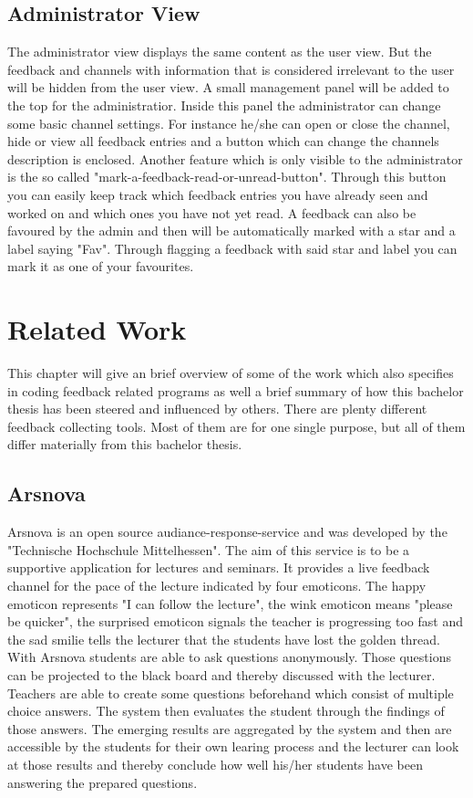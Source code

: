 \section{Administrator View}
The administrator view displays the same content as the user view. But the feedback and channels with information that is considered irrelevant to the user will be hidden from the user view. A small management panel will be added to the top for the administratior. Inside this panel the administrator can change some basic channel settings. For instance he/she can open or close the channel, hide or view all feedback entries and a button which can change the channels description is enclosed.
Another feature which is only visible to the administrator is the so called "mark-a-feedback-read-or-unread-button". Through this button you can easily keep track which feedback entries  you have already seen and worked on and which ones you have not yet read. A feedback can also be favoured by the admin and then will be automatically marked with a star and a label saying "Fav". Through flagging a feedback with said star and label you can mark it as one of your favourites.


\chapter{Related Work}
This chapter will give an brief overview of some of the work which also specifies in coding feedback related programs as well a brief summary of how this bachelor thesis has been steered and influenced by others. There are plenty different feedback collecting tools. Most of them are for one single purpose, but all of them differ materially from this bachelor thesis.

\section{Arsnova}
Arsnova is an open source audiance-response-service and was developed by the "Technische Hochschule Mittelhessen". The aim of this service is to be a supportive application for lectures and seminars. It provides a live feedback channel for the pace of the lecture indicated by four emoticons. The happy emoticon represents "I can follow the lecture", the wink emoticon means "please be quicker", the surprised emoticon signals the teacher is progressing too fast and the sad smilie tells the lecturer that the students have lost the golden thread. 
With Arsnova students are able to ask questions anonymously. Those questions can be projected to the black board and thereby discussed with the lecturer. Teachers are able to create some questions beforehand which consist of multiple choice answers. The system then evaluates the student through the findings of those answers. 
The emerging results are aggregated by the system and then are accessible by the students for their own learing process and the lecturer can look at those results and thereby conclude how well his/her students have been answering the prepared questions.

